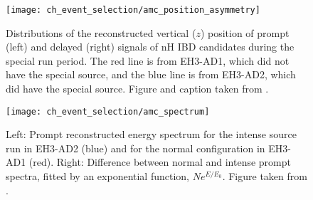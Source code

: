 \begin{figure}
    \centering
    \texttt{[image: ch\_event\_selection/amc\_position\_asymmetry]}
    \caption{
        Distributions of the reconstructed vertical ($z$) position
        of prompt (left) and delayed (right) signals of nH IBD candidates
        during the special \amc{} run period.
        The red line is from EH3-AD1, which did not have the special \amc{} source,
        and the blue line is from EH3-AD2, which did have the special \amc{} source.
        Figure and caption taken from \cite{nh2016technote}.
    }
    \label{fig:amc_position}
\end{figure}

\begin{figure}
    \centering
    \texttt{[image: ch\_event\_selection/amc\_spectrum]}
    \caption{
        Left: Prompt reconstructed energy spectrum
        for the intense \amc{} source run in EH3-AD2 (blue)
        and for the normal configuration in EH3-AD1 (red).
        Right: Difference between normal and intense prompt spectra,
        fitted by an exponential function, $Ne^{E/E_0}$.
        Figure taken from \cite{nh2016technote}.
    }
    \label{fig:amc_spectrum}
\end{figure}


